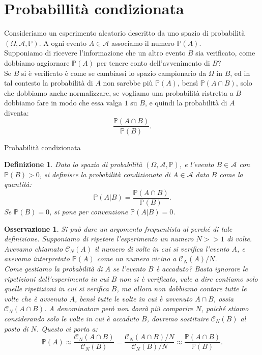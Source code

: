 \documentclass[11pt]{book}
\theoremstyle{Definizione}
\newtheorem*{mydef}{Definizione}
\theoremstyle{TeoremaProposizioneLemmaCorollario}
\theoremstyle{OsservazioneNota}
\newtheorem{myobs}{Osservazione}[section]
\renewcommand{\P}{\mathbb{P}}
\begin{document}
\section{Probabillità condizionata}
Consideriamo un esperimento aleatorio descritto da uno spazio di probabilità $(\Omega,\mathcal{A},\P)$. A ogni evento $A\in \mathcal{A}$ associamo il numero $\P(A)$.\\
Supponiamo di ricevere l'informazione che un altro evento $B$ sia verificato, come dobbiamo aggiornare $\P(A)$ per tenere conto dell'avvenimento di $B$?\\
Se $B$ si è verificato è come se cambiassi lo spazio campionario da $\Omega$ in $B$, ed in tal contesto la probabilità di $A$ non sarebbe più $\P(A)$, bensì $\P(A\cap B)$, solo che dobbiamo anche normalizzare, se vogliamo una probabilità ristretta a $B$ dobbiamo fare in modo che essa valga $1$ su $B$, e quindi la probabilità di $A$ diventa:
$$
\frac{\P(A\cap B)}{\P(B)}.
$$
\begin{boxdef}{Probabilità condizionata}
\begin{mydef}
Dato lo spazio di probabilità $(\Omega,\mathcal{A},\P)$, e l'evento $B\in \mathcal{A}$ con $\P(B) > 0$, si definisce la probabilità condizionata di $A\in \mathcal{A}$ dato $B$ come la quantità:
$$
\P(A|B) = \frac{\P(A\cap B)}{\P(B)}.
$$
Se $\P(B) = 0$, si pone per convenzione $\P(A|B) = 0$.
\end{mydef}
\end{boxdef}
\begin{myobs}
Si può dare un argomento frequentista al perché di tale definizione. Supponiamo di ripetere l'esperimento un numero $N > > 1$ di volte. Avevamo chiamato $\mathcal{C}_N(A)$ il numero di volte in cui si verifica l'evento $A$, e avevamo interpretato $\P(A)$ come un numero vicino a $\mathcal{C}_N(A) /N$.\\
Come gestiamo la probabilità di $A$ se l'evento $B$ è accaduto? Basta ignorare le ripetizioni dell'esperimento in cui $B$ non si è verificato, vale a dire contiamo solo quelle ripetizioni in cui si verifica $B$, ma allora non dobbiamo contare tutte le volte che è avvenuto $A$, bensì tutte le volte in cui è avvenuto $A\cap B$, ossia $\mathcal{C}_N(A\cap B)$. A denominatore però non dovrà più comparire $N$, poiché stiamo considerando solo le volte in cui è accaduto $B$, dovremo sostituire $\mathcal{C}_N(B)$ al posto di $N$. Questo ci porta a:
$$
\P(A) \approx \frac{\mathcal{C}_N(A\cap B)}{\mathcal{C}_N(B)} = \frac{\mathcal{C}_N(A\cap B)/N}{\mathcal{C}_N(B)/N} \approx \frac{\P(A\cap B)}{\P(B)}.
$$
\end{myobs}
\end{document}

